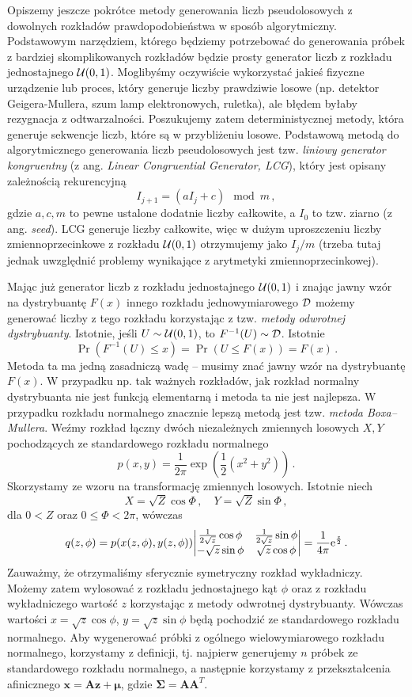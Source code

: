 \documentclass{myclass}
\numberwithin{equation}{subsection}
\begin{document}
Opiszemy jeszcze pokrótce metody generowania liczb pseudolosowych z dowolnych rozkładów
prawdopodobieństwa w sposób algorytmiczny. Podstawowym narzędziem, którego będziemy potrzebować do
generowania próbek z bardziej skomplikowanych rozkładów będzie prosty generator liczb z rozkładu
jednostajnego \(\mathcal{U}(0,1)\). Moglibyśmy oczywiście wykorzystać jakieś fizyczne urządzenie lub
proces, który generuje liczby prawdziwie losowe (np. detektor Geigera-Mullera, szum lamp
elektronowych, ruletka), ale błędem byłaby rezygnacja z odtwarzalności. Poszukujemy zatem
deterministycznej metody, która generuje sekwencje liczb, które są w przybliżeniu losowe. Podstawową
metodą do algorytmicznego generowania liczb pseudolosowych jest tzw. \emph{liniowy generator
kongruentny} (z ang. \textit{Linear Congruential Generator, LCG}), który jest opisany zależnością
rekurencyjną
\[
I_{j+1} = (a I_j + c) \mod m\,,
\]
gdzie \(a, c, m\) to pewne ustalone dodatnie liczby całkowite, a \(I_0\) to tzw. ziarno (z ang.
\textit{seed}). LCG generuje liczby całkowite, więc w dużym uproszczeniu liczby zmiennoprzecinkowe z
rozkładu \(\mathcal{U}(0,1)\) otrzymujemy jako \(I_j / m\) (trzeba tutaj jednak uwzględnić problemy
wynikające z arytmetyki zmiennoprzecinkowej).

Mając już generator liczb z rozkładu jednostajnego \(\mathcal{U}(0,1)\) i znając jawny wzór na
dystrybuantę \(F(x)\) innego rozkładu jednowymiarowego \(\mathcal{D}\) możemy generować liczby z tego
rozkładu korzystając z tzw. \emph{metody odwrotnej dystrybuanty}. Istotnie, jeśli \(U \sim
\mathcal{U}(0,1)\), to \(F^{-1}(U) \sim \mathcal{D}\). Istotnie
\[
\Pr(F^{-1}(U) \leq x) = \Pr(U \leq F(x)) = F(x)\,.
\]
Metoda ta ma jedną zasadniczą wadę -- musimy znać jawny wzór na dystrybuantę \(F(x)\). W przypadku
np. tak ważnych rozkładów, jak rozkład normalny dystrybuanta nie jest funkcją elementarną i metoda
ta nie jest najlepsza. W przypadku rozkładu normalnego znacznie lepszą metodą jest tzw. \emph{metoda
Boxa--Mullera}. Weźmy rozkład łączny dwóch niezależnych zmiennych losowych \(X, Y\) pochodzących ze
standardowego rozkładu normalnego
\[
p(x, y) = \frac{1}{2\pi}\exp(\frac{1}{2}(x^2 + y^2))\,.
\]
Skorzystamy ze wzoru na transformację zmiennych losowych. Istotnie niech
\[
X = \sqrt{Z} \cos \Phi\,,\quad Y = \sqrt{Z} \sin \Phi\,,
\]
dla \(0 < Z\) oraz \( 0 \leq \Phi < 2\pi\), wówczas
\[
q(z, \phi) = p(x(z,\phi), y(z,\phi)) \mqty| \frac{1}{2\sqrt{z}}\cos\phi & \frac{1}{2\sqrt{z}}\sin\phi \\ -\sqrt{z}\sin\phi & \sqrt{z}\cos\phi| = \frac{1}{4\pi}\e^\frac{z}{2}\,.
\]
Zauważmy, że otrzymaliśmy sferycznie symetryczny rozkład wykładniczy. Możemy zatem wylosować z
rozkładu jednostajnego kąt \(\phi\) oraz z rozkładu wykładniczego wartość \(z\) korzystając z metody
odwrotnej dystrybuanty. Wówczas wartości \(x = \sqrt{z}\cos\phi\), \(y = \sqrt{z}\sin\phi\) będą
pochodzić ze standardowego rozkładu normalnego. Aby wygenerować próbki z ogólnego wielowymiarowego
rozkładu normalnego, korzystamy z definicji, tj. najpierw generujemy \(n\) próbek ze standardowego
rozkładu normalnego, a następnie korzystamy z przekształcenia afinicznego \(\bm{x} = \bm{A}\bm{z} +
\bm{\mu}\), gdzie \(\bm{\Sigma} = \bm{A}\bm{A}^T\).
\end{document}
